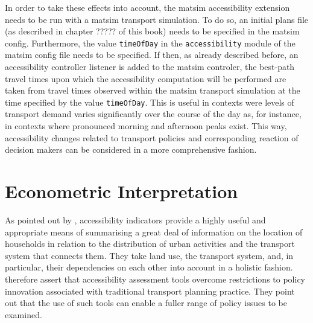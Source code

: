 
In order to take these effects into account, the \gls{matsim} accessibility extension needs to be run with a \gls{matsim} 
transport simulation. To do so, an initial plans file (as described in chapter ????? of this book) 
needs to be specified 
in the \gls{matsim} config. Furthermore, the value \lstinline{timeOfDay} in the \lstinline{accessibility} module of the \gls{matsim}
config file needs to be specified. If then, as already described before, an accessibility controller listener is added to 
the \gls{matsim} controler, the best-path travel times upon which the accessibility computation will be performed are taken 
from travel times observed within the \gls{matsim} transport simulation at the time specified by the value \lstinline{timeOfDay}.
This is useful in contexts were levels of transport demand varies significantly over the course of the day as, for instance, 
in contexts where pronounced morning and afternoon peaks exist. This way, accessibility changes related to transport policies
and corresponding reaction of decision makers can be considered in a more comprehensive fashion. 


\section{Econometric Interpretation}
As pointed out by \citet{MorrisEtAl1978AccessibilityIndicatorsaccessibility}, accessibility indicators provide a highly
useful and appropriate means of summarising a great deal of information on the location of households in relation to 
the distribution of urban activities and the transport system that connects them.
%
%
They take land use, the transport system, and, in particular, their dependencies on each other into
account in a holistic fashion.
%
%
\citet{CurtisEtAl2013AccessbilityPolicyInnovation} therefore assert that accessibility assessment tools overcome
restrictions to policy innovation associated with traditional transport planning practice. They point out that the use of
such tools can enable a fuller range of policy issues to be examined.

